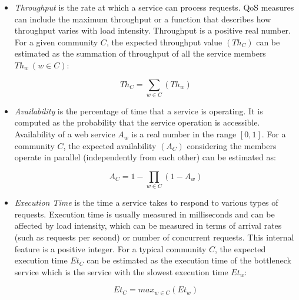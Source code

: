 \begin{itemize}

  \item \emph{Throughput} is the rate at which a service can process requests. QoS measures can include the maximum throughput or a function that describes how throughput varies with load intensity. Throughput is a positive real number. For a given community $C$, the expected throughput value $(Th_{C})$ can be estimated as the summation of throughput of all the service members $Th_{w}~ (w \in C)$:
	
	\begin{equation}
		 Th_{C} = \sum_{w \in C}{(Th_{w})}
	\end{equation}
	
	\item \emph{Availability} is the percentage of time that a service is operating. It is computed as
the probability that the service operation is accessible. Availability of a web service $A_w$ is a real number in the range $[0, 1]$. For a community $C$, the expected availability $(A_{C})$ considering the members operate in parallel (independently from each other) can be estimated as:
	
	\begin{equation}
		A_{C} = 1-\prod_{w \in C}{(1-A_{w})}
	\end{equation}
	
	\item \emph{Execution Time} is the time a service takes to respond to various types of requests.
	Execution time is usually measured in milliseconds and can be affected by load intensity, which can be measured in terms of arrival rates (such as requests per second) or number of concurrent requests. This internal feature is a positive integer. For a typical community $C$, the expected execution time $Et_{C}$ can be estimated as the execution time of the bottleneck service which is the service with the slowest execution time $Et_{w}$:
	
	\begin{equation}
		Et_{C} = max_{w \in C}{(Et_{w})}
	\end{equation}
	
\end{itemize}


